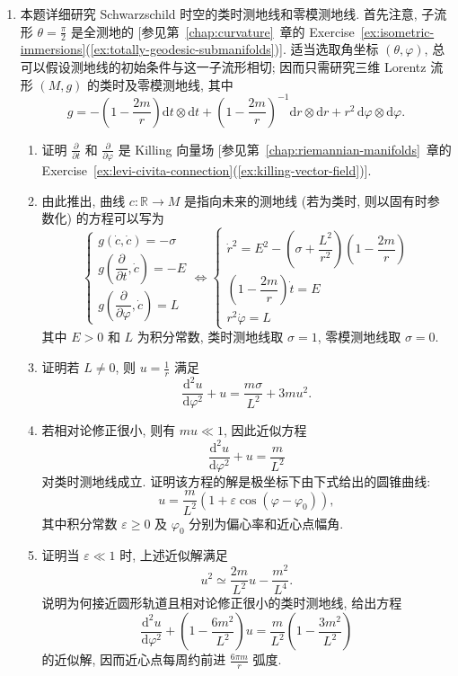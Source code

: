 \begin{RiemannExercise}
\begin{enumerate}[label=(\arabic*),ref=\arabic*,leftmargin=*]
\begin{enumerate}[label=(\alph*),leftmargin=*]
(\textbf{注}: 这是静止观察者之间作局部距离测量所得的度量; 粗略地说, 引力使空间变形.)
\end{enumerate}
\item\label{ex:schwarzschild-orbits-and-light-deflection}
本题详细研究 Schwarzschild 时空的类时测地线和零模测地线. 首先注意, 子流形 $\theta=\frac{\pi}{2}$ 是全测地的 [参见第~\ref{chap:curvature}~章的 Exercise~\ref{ex:isometric-immersions}(\ref{ex:totally-geodesic-submanifolds})]. 适当选取角坐标 $(\theta,\varphi)$, 总可以假设测地线的初始条件与这一子流形相切; 因而只需研究三维 Lorentz 流形 $(M,g)$ 的类时及零模测地线, 其中
\[
  g=-\left(1-\frac{2m}{r}\right)\mathrm{d}t\otimes\mathrm{d}t
    +\left(1-\frac{2m}{r}\right)^{-1}\mathrm{d}r\otimes\mathrm{d}r
    +r^2\,\mathrm{d}\varphi\otimes\mathrm{d}\varphi.
\]
\begin{enumerate}[label=(\alph*),leftmargin=*]
\item 证明 $\frac{\partial}{\partial t}$ 和 $\frac{\partial}{\partial\varphi}$ 是 Killing 向量场 [参见第~\ref{chap:riemannian-manifolds}~章的 Exercise~\ref{ex:levi-civita-connection}(\ref{ex:killing-vector-field})].
\item 由此推出, 曲线 $c:\mathbb{R}\to M$ 是指向未来的测地线 (若为类时, 则以固有时参数化) 的方程可以写为
\[
  \begin{cases}
    g(\dot c,\dot c)=-\sigma\\[.5ex]
    g\left(\dfrac{\partial}{\partial t},\dot c\right)=-E\\[.5ex]
    g\left(\dfrac{\partial}{\partial\varphi},\dot c\right)=L
  \end{cases}
  \iff
  \begin{cases}
    \dot r^2=E^2-\left(\sigma+\dfrac{L^2}{r^2}\right)\left(1-\dfrac{2m}{r}\right)\\[.6ex]
    \left(1-\dfrac{2m}{r}\right)\dot t=E\\[.6ex]
    r^2\dot\varphi=L
  \end{cases}
\]
其中 $E>0$ 和 $L$ 为积分常数, 类时测地线取 $\sigma=1$, 零模测地线取 $\sigma=0$.
\item 证明若 $L\ne0$, 则 $u=\frac{1}{r}$ 满足
\[
  \frac{\mathrm{d}^2u}{\mathrm{d}\varphi^2}+u=\frac{m\sigma}{L^2}+3mu^2.
\]
\item 若相对论修正很小, 则有 $mu\ll1$, 因此近似方程
\[
  \frac{\mathrm{d}^2u}{\mathrm{d}\varphi^2}+u=\frac{m}{L^2}
\]
对类时测地线成立. 证明该方程的解是极坐标下由下式给出的圆锥曲线:
\[
  u=\frac{m}{L^2}(1+\varepsilon\cos(\varphi-\varphi_0)),
\]
其中积分常数 $\varepsilon\geq0$ 及 $\varphi_0$ 分别为偏心率和近心点幅角.
\item 证明当 $\varepsilon\ll1$ 时, 上述近似解满足
\[
  u^2\simeq\frac{2m}{L^2}u-\frac{m^2}{L^4}.
\]
说明为何接近圆形轨道且相对论修正很小的类时测地线, 给出方程
\[
  \frac{\mathrm{d}^2u}{\mathrm{d}\varphi^2}
  +\left(1-\frac{6m^2}{L^2}\right)u
  =\frac{m}{L^2}\left(1-\frac{3m^2}{L^2}\right)
\]
的近似解, 因而近心点每周约前进 $\frac{6\pi m}{r}$ 弧度.


\end{enumerate}
\end{enumerate}
\end{RiemannExercise}
